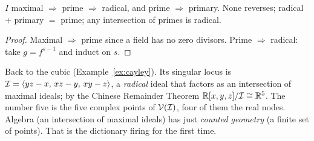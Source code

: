 \begin{proposition}\label{prop:impl}
$I$ maximal $\Rightarrow$ prime $\Rightarrow$ radical, and prime $\Rightarrow$ primary.
None reverses; radical $+$ primary $=$ prime; any intersection of primes is radical.
\end{proposition}
\begin{proof}
Maximal $\Rightarrow$ prime since a field has no zero divisors. Prime $\Rightarrow$ radical:
take $g=f^{s-1}$ and induct on $s$. 
\end{proof}


\begin{strand}
Back to the cubic (Example~\ref{ex:cayley}). Its singular locus is $\mathcal{I}=\langle yz-x,\,xz-y,\,xy-z\rangle$,
a \emph{radical} ideal that factors as an intersection of  maximal ideals; by the
Chinese Remainder Theorem $\mathbb{R}[x,y,z]/\mathcal{I}\cong\mathbb{R}^5$. The number five is the five complex points
of $\mathcal{V}(\mathcal{I})$, four of them the real nodes. Algebra (an intersection of maximal ideals) has just
\emph{counted geometry} (a finite set of points). That is the dictionary firing for the first time.
\end{strand}

